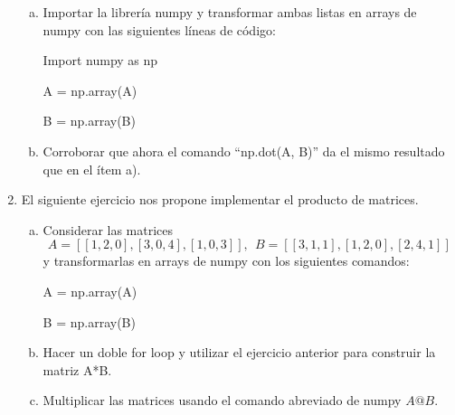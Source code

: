 \documentclass[12pt]{article}
\begin{document}
\begin{center}
\begin{enumerate}
\begin{enumerate}[a)]
                    \item Importar la librería numpy y transformar ambas listas en arrays de numpy con las
                    siguientes líneas de código:

                     Import numpy as np

                     A = np.array(A)

                     B = np.array(B)
                    
                    \item Corroborar que ahora el comando “np.dot(A, B)” da el mismo resultado que en el ítem a).
                \end{enumerate}

                \item El siguiente ejercicio nos propone implementar el producto de matrices.
                \begin{enumerate}[a)]
                    \item Considerar las matrices
                    \[
                        A = [[1, 2, 0],
                        [3, 0, 4],
                        [1, 0, 3]], \ \ 
                        B = [[3, 1, 1],
                        [1, 2, 0],
                        [2, 4, 1]]
                    \]
                    y transformarlas en arrays de numpy con los siguientes comandos:

                    A = np.array(A)

                    B = np.array(B)

                    \item Hacer un doble for loop y utilizar el ejercicio anterior para construir la matriz A*B.

                    \item Multiplicar las matrices usando el comando abreviado de numpy $A @ B$.
                \end{enumerate}


\end{enumerate}
\end{center}
\end{document}
